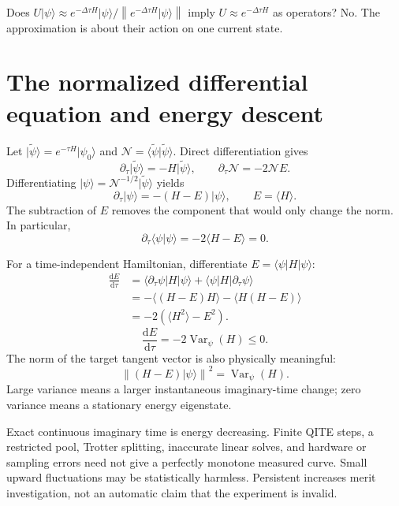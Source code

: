 \documentclass[11pt,a4paper]{article}
\newcommand{\ket}[1]{\lvert #1\rangle}
\newcommand{\bra}[1]{\langle #1\rvert}
\newcommand{\braket}[2]{\langle #1\vert #2\rangle}
\newcommand{\ex}[1]{\langle #1\rangle}
\newcommand{\norm}[1]{\left\lVert #1\right\rVert}
\newcommand{\Var}{\operatorname{Var}}
\newcommand{\dd}{\mathrm{d}}
\newcommand{\dt}{\Delta\tau}
\newcommand{\lesson}[2]{\clearpage\section{#1}\label{#2}}
\newcommand{\checkpoint}[1]{\begin{idea}[Pause and check]#1\end{idea}}
\begin{document}
\checkpoint{Does $U\ket{\psi}\approx e^{-\dt H}\ket{\psi}/\norm{e^{-\dt H}\ket{\psi}}$ imply $U\approx e^{-\dt H}$ as operators? No. The approximation is about their action on one current state.}

\lesson{The normalized differential equation and energy descent}{sec:flow}
Let $\ket{\widetilde\psi}=e^{-\tau H}\ket{\psi_0}$ and $\mathcal N=\braket{\widetilde\psi}{\widetilde\psi}$. Direct differentiation gives
\[
\partial_\tau\ket{\widetilde\psi}=-H\ket{\widetilde\psi},\qquad
\partial_\tau\mathcal N=-2\mathcal N E.
\]
Differentiating $\ket{\psi}=\mathcal N^{-1/2}\ket{\widetilde\psi}$ yields
\begin{equation}
\boxed{\partial_\tau\ket{\psi}=-(H-E)\ket{\psi},\qquad E=\ex{H}.}
\label{eq:flow}
\end{equation}
The subtraction of $E$ removes the component that would only change the norm. In particular,
\[
\partial_\tau\braket{\psi}{\psi}=-2\ex{H-E}=0.
\]

For a time-independent Hamiltonian, differentiate $E=\bra{\psi}H\ket{\psi}$:
\begin{align*}
\frac{\dd E}{\dd\tau}
&=\bra{\partial_\tau\psi}H\ket{\psi}
 +\bra{\psi}H\ket{\partial_\tau\psi}\\
&=-\ex{(H-E)H}-\ex{H(H-E)}\\
&=-2(\ex{H^2}-E^2).
\end{align*}
\begin{equation}
\boxed{\frac{\dd E}{\dd\tau}=-2\Var_\psi(H)\le0.}
\label{eq:descent}
\end{equation}
The norm of the target tangent vector is also physically meaningful:
\[
\norm{(H-E)\ket{\psi}}^2=\Var_\psi(H).
\]
Large variance means a larger instantaneous imaginary-time change; zero variance means a stationary energy eigenstate.

\begin{caution}
Exact continuous imaginary time is energy decreasing. Finite QITE steps, a restricted pool, Trotter splitting, inaccurate linear solves, and hardware or sampling errors need not give a perfectly monotone measured curve. Small upward fluctuations may be statistically harmless. Persistent increases merit investigation, not an automatic claim that the experiment is invalid.
\end{caution}
\end{document}
